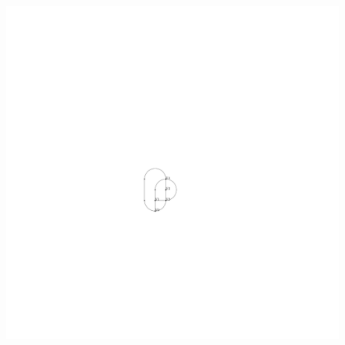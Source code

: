 \documentclass{beamer}
\begin{document}
\begin{frame}
\begin{columns}[c]
\begin{column}{5cm}
\begin{figure}[h]
  \includegraphics[scale=.7]{exampleA/smoothComplex}
  \label{fig:exampleAsmoothComplex}
\end{figure}
\end{column}
\end{columns}
\end{frame}
\end{document}
